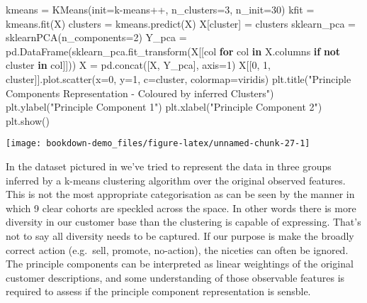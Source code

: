 \documentclass[]{tufte-book}
\newenvironment{Shaded}{}{}
\newcommand{\ControlFlowTok}[1]{\textcolor[rgb]{0.00,0.44,0.13}{\textbf{#1}}}
\newcommand{\DecValTok}[1]{\textcolor[rgb]{0.25,0.63,0.44}{#1}}
\newcommand{\KeywordTok}[1]{\textcolor[rgb]{0.00,0.44,0.13}{\textbf{#1}}}
\newcommand{\NormalTok}[1]{#1}
\newcommand{\OperatorTok}[1]{\textcolor[rgb]{0.40,0.40,0.40}{#1}}
\newcommand{\StringTok}[1]{\textcolor[rgb]{0.25,0.44,0.63}{#1}}
\theoremstyle{definition}
\theoremstyle{definition}
\theoremstyle{definition}
\theoremstyle{remark}
\begin{document}
\begin{Shaded}
\begin{Highlighting}[]
\NormalTok{kmeans }\OperatorTok{=}\NormalTok{ KMeans(init}\OperatorTok{=}\StringTok{\textquotesingle{}k{-}means++\textquotesingle{}}\NormalTok{, n\_clusters}\OperatorTok{=}\DecValTok{3}\NormalTok{, n\_init}\OperatorTok{=}\DecValTok{30}\NormalTok{)}
\NormalTok{kfit }\OperatorTok{=}\NormalTok{ kmeans.fit(X)}
\NormalTok{clusters }\OperatorTok{=}\NormalTok{ kmeans.predict(X)}
\NormalTok{X[}\StringTok{\textquotesingle{}cluster\textquotesingle{}}\NormalTok{] }\OperatorTok{=}\NormalTok{ clusters}
\NormalTok{sklearn\_pca }\OperatorTok{=}\NormalTok{ sklearnPCA(n\_components}\OperatorTok{=}\DecValTok{2}\NormalTok{)}
\NormalTok{Y\_pca }\OperatorTok{=}\NormalTok{ pd.DataFrame(sklearn\_pca.fit\_transform(X[[col }\ControlFlowTok{for}\NormalTok{ col }\KeywordTok{in}\NormalTok{ X.columns }\ControlFlowTok{if}
                                         \KeywordTok{not} \StringTok{\textquotesingle{}cluster\textquotesingle{}} \KeywordTok{in}\NormalTok{ col]]))}
\NormalTok{X }\OperatorTok{=}\NormalTok{ pd.concat([X, Y\_pca], axis}\OperatorTok{=}\DecValTok{1}\NormalTok{)}
\NormalTok{X[[}\DecValTok{0}\NormalTok{, }\DecValTok{1}\NormalTok{, }\StringTok{\textquotesingle{}cluster\textquotesingle{}}\NormalTok{]].plot.scatter(x}\OperatorTok{=}\DecValTok{0}\NormalTok{,}
\NormalTok{                      y}\OperatorTok{=}\DecValTok{1}\NormalTok{,}
\NormalTok{                      c}\OperatorTok{=}\StringTok{\textquotesingle{}cluster\textquotesingle{}}\NormalTok{,}
\NormalTok{                      colormap}\OperatorTok{=}\StringTok{\textquotesingle{}viridis\textquotesingle{}}\NormalTok{)}
\NormalTok{plt.title(}\StringTok{"Principle Components Representation {-} Coloured by inferred Clusters"}\NormalTok{)}
\NormalTok{plt.ylabel(}\StringTok{"Principle Component 1"}\NormalTok{)}
\NormalTok{plt.xlabel(}\StringTok{"Principle Component 2"}\NormalTok{)}
\NormalTok{plt.show()}
\end{Highlighting}
\end{Shaded}

\texttt{[image: bookdown-demo\_files/figure-latex/unnamed-chunk-27-1]}

In the dataset pictured in we've tried to represent the data in three groups inferred by a k-means clustering algorithm over the original observed features. This is not the most appropriate categorisation as can be seen by the manner in which 9 clear cohorts are speckled across the space. In other words there is more diversity in our customer base than the clustering is capable of expressing. That's not to say all diversity needs to be captured. If our purpose is make the broadly correct action (e.g.~sell, promote, no-action), the niceties can often be ignored. The principle components can be interpreted as linear weightings of the original customer descriptions, and some understanding of those observable features is required to assess if the principle component representation is sensble.
\end{document}
